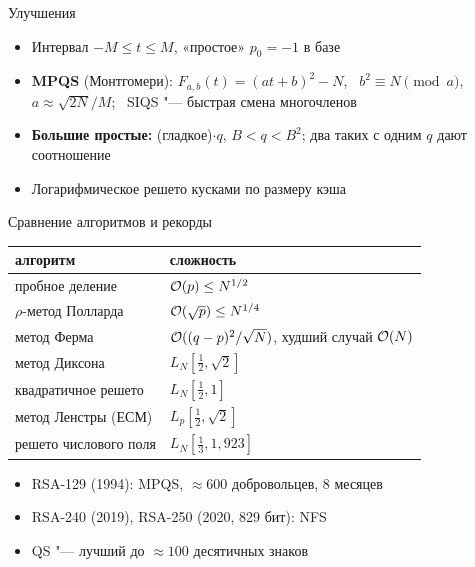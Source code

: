 \documentclass{ca-slides}
\begin{document}
\begin{canvasframe}{Улучшения}
  \begin{itemize}
    \item Интервал $-M \le t \le M$, «простое» $p_0 = -1$ в базе
    \item \textbf{MPQS} (Монтгомери): $F_{a,b}(t) = (at + b)^2 - N$, \ $b^2 \equiv N \pmod a$,
      \ $a \approx \sqrt{2N}/M$; \ SIQS "--- быстрая смена многочленов
    \item \textbf{Большие простые:} (гладкое)$\cdot q$, $B < q < B^2$; два таких с одним $q$
      дают соотношение
    \item Логарифмическое решето кусками по размеру кэша
  \end{itemize}
  \vfill
\end{canvasframe}

\begin{canvasframe}[shrink=5]{Сравнение алгоритмов и рекорды}
  \small
  \begin{tabular}{l|l}
    алгоритм & сложность \\ \hline
    пробное деление & $\mathcal{O}(p) \le N^{1/2}$ \\
    $\rho$-метод Полларда & $\mathcal{O}(\sqrt p) \le N^{1/4}$ \\
    метод Ферма & $\mathcal{O}((q - p)^2/\sqrt N)$, худший случай $\mathcal{O}(N)$ \\
    метод Диксона & $L_N[\frac12, \sqrt2]$ \\
    квадратичное решето & $L_N[\frac12, 1]$ \\
    метод Ленстры (ЕСМ) & $L_p[\frac12, \sqrt2]$ \\
    решето числового поля & $L_N[\frac13, 1{,}923]$
  \end{tabular}
  \begin{itemize}
    \item RSA-129 (1994): MPQS, $\approx 600$ добровольцев, 8 месяцев
    \item RSA-240 (2019), RSA-250 (2020, 829 бит): NFS
    \item QS "--- лучший до $\approx 100$ десятичных знаков
  \end{itemize}
\end{canvasframe}
\end{document}
